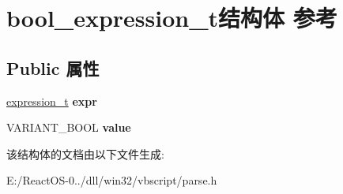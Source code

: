 \hypertarget{structbool__expression__t}{}\section{bool\+\_\+expression\+\_\+t结构体 参考}
\label{structbool__expression__t}
\subsection*{Public 属性}
\begin{DoxyCompactItemize}
\item 
\mbox{\label{structbool__expression__t_af05d82c6475edd3e5fcf73aedf774821}} 
\hyperlink{struct__expression__t}{expression\+\_\+t} {\bfseries expr}
\item 
\mbox{\label{structbool__expression__t_afe4b3f6a151931181b045022f43d01ef}} 
V\+A\+R\+I\+A\+N\+T\+\_\+\+B\+O\+OL {\bfseries value}
\end{DoxyCompactItemize}


该结构体的文档由以下文件生成\+:\begin{DoxyCompactItemize}
\item 
E\+:/\+React\+O\+S-\/0../dll/win32/vbscript/parse.\+h\end{DoxyCompactItemize}
